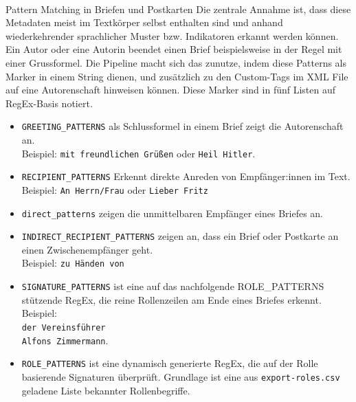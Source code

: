 \documentclass[12pt, a4paper, ngerman, bidi=default]{article}
\makeatletter
\newcommand{\code}[1]{\colorbox{VeryLightGray}{\texttt{#1}}} %
\let\oldparagraph\paragraph%
\renewcommand{\paragraph}{
    \@ifstar%
      \xxxParagraphStar%
      \xxxParagraphNoStar%
 }
\newcommand{\xxxParagraphStar}[1]{\oldparagraph*{#1}\mbox{}}
\newcommand{\xxxParagraphNoStar}[1]{\oldparagraph{#1}\mbox{}}
\makeatother
\begin{document}
\paragraph{Pattern Matching in Briefen und Postkarten}
Die zentrale Annahme ist, dass diese Metadaten meist im Textkörper selbst enthalten sind und anhand wiederkehrender sprachlicher Muster bzw. Indikatoren erkannt werden können. Ein Autor oder eine Autorin beendet einen Brief beispielsweise in der Regel mit einer Grussformel. Die Pipeline macht sich das zunutze, indem diese Patterns als Marker in einem String dienen, und zusätzlich zu den Custom-Tags im XML File auf eine Autorenschaft hinweisen können. Diese Marker sind in fünf Listen auf RegEx-Basis notiert.
\begin{itemize}
    \item \code{GREETING\_PATTERNS} als Schlussformel in einem Brief zeigt die Autorenschaft an. \\Beispiel: \texttt{mit freundlichen Grüßen} oder \texttt{Heil Hitler}.
    \item \code{RECIPIENT\_PATTERNS} Erkennt direkte Anreden von Empfänger:innen im Text. \\Beispiel: \texttt{An Herrn/Frau} oder \texttt{Lieber Fritz}
    \item \code{direct\_patterns} zeigen die unmittelbaren Empfänger eines Briefes an.
    \item \code{INDIRECT\_RECIPIENT\_PATTERNS} zeigen an, dass ein Brief oder Postkarte an einen Zwischenempfänger geht. \\Beispiel: \texttt{zu Händen von}
    \item \code{SIGNATURE\_PATTERNS} ist eine auf das nachfolgende ROLE\_PATTERNS stützende RegEx, die reine Rollenzeilen am Ende eines Briefes erkennt. Beispiel:\\
    \texttt{der Vereinsführer\\Alfons Zimmermann}. \\ 
    \item \code{ROLE\_PATTERNS} ist eine dynamisch generierte RegEx, die auf der Rolle basierende Signaturen überprüft. Grundlage ist eine aus \code{export-roles.csv} geladene Liste bekannter Rollenbegriffe.
\end{itemize}
\end{document}
